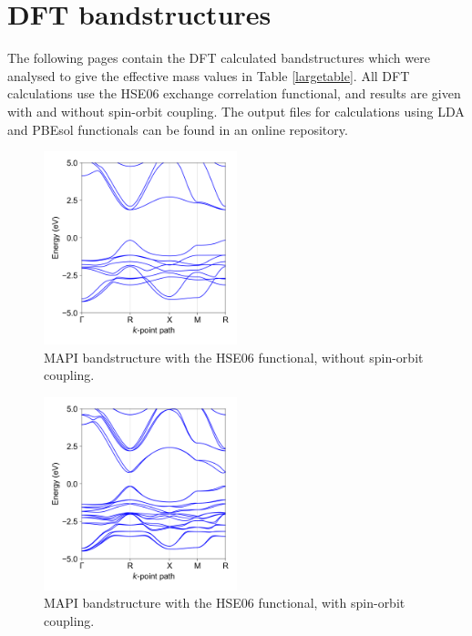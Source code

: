 \chapter{\label{app:2-bandstructures}DFT bandstructures}

The following pages contain the DFT calculated bandstructures which were analysed to give the effective mass values in Table \ref{largetable}. All DFT calculations use the HSE06 exchange correlation functional, and results  are given with and without spin-orbit coupling. The output files for calculations using LDA and PBEsol functionals can be found in an online repository.\cite{Whalley2018b}

\clearpage

\begin{figure}[htb] \centering
\includegraphics[width=0.5\textwidth]{./figures/ap2/MAPI_hybrid.png}
\caption[MAPI bandstructure, HSE06, no-SoC]{MAPI bandstructure with the HSE06 functional, without spin-orbit coupling. }
\end{figure}

\begin{figure}[htb] \centering
\includegraphics[width=0.5\textwidth]{./figures/ap2/MAPI_hybrid_SoC.png}
\caption[MAPI bandstructure, HSE06, SoC]{MAPI bandstructure with the HSE06 functional, with spin-orbit coupling. }
\end{figure}

